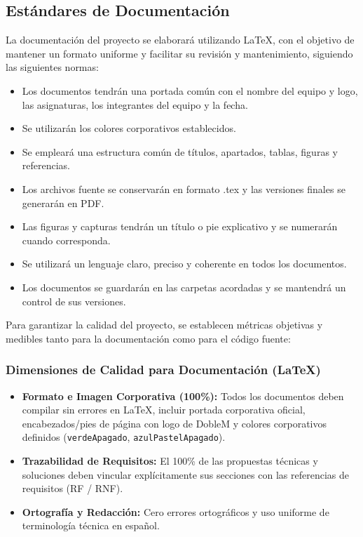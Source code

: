 \subsection{Estándares de Documentación}

La documentación del proyecto se elaborará utilizando \LaTeX, con el objetivo de mantener un formato uniforme y facilitar su revisión y mantenimiento, siguiendo las siguientes normas:

\begin{itemize}
    \item Los documentos tendrán una portada común con el nombre del equipo y logo, las asignaturas, los integrantes del equipo y la fecha.
    \item Se utilizarán los colores corporativos establecidos.
    \item Se empleará una estructura común de títulos, apartados, tablas, figuras y referencias.
    \item Los archivos fuente se conservarán en formato .tex y las versiones finales se generarán en PDF.
    \item Las figuras y capturas tendrán un título o pie explicativo y se numerarán cuando corresponda.
    \item Se utilizará un lenguaje claro, preciso y coherente en todos los documentos.
    \item Los documentos se guardarán en las carpetas acordadas y se mantendrá un control de sus versiones.
\end{itemize}
Para garantizar la calidad del proyecto, se establecen métricas objetivas y medibles tanto para la documentación como para el código fuente:

\subsubsection{Dimensiones de Calidad para Documentación (\LaTeX)}
\begin{itemize}
    \item \textbf{Formato e Imagen Corporativa (100\%):} Todos los documentos deben compilar sin errores en \LaTeX, incluir portada corporativa oficial, encabezados/pies de página con logo de DobleM y colores corporativos definidos (\texttt{verdeApagado}, \texttt{azulPastelApagado}).
    \item \textbf{Trazabilidad de Requisitos:} El 100\% de las propuestas técnicas y soluciones deben vincular explícitamente sus secciones con las referencias de requisitos (RF / RNF).
    \item \textbf{Ortografía y Redacción:} Cero errores ortográficos y uso uniforme de terminología técnica en español.
\end{itemize}

